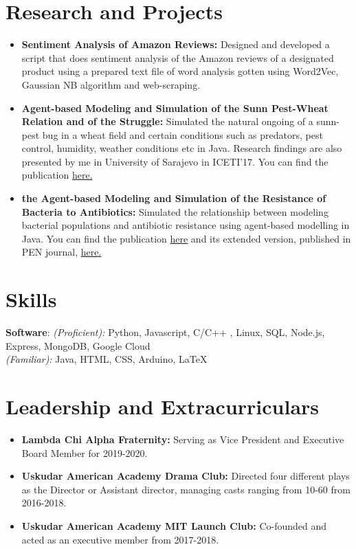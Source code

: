 \documentclass[letterpaper,11pt]{article}
\newcommand{\resumeItem}[2]{
  \item\small{
    \textbf{#1}{#2 \vspace{-2pt}}
  }
}
\newcommand{\resumeSubItem}[2]{\resumeItem{#1}{#2}\vspace{-4pt}}
\newcommand{\resumeSubHeadingListStart}{\begin{itemize}[leftmargin=*]}
\newcommand{\resumeSubHeadingListEnd}{\end{itemize}}
\begin{document}
	\section{Research and Projects}
	\resumeSubHeadingListStart
	\resumeSubItem{Sentiment Analysis of Amazon Reviews: }
	{Designed and developed a script that does sentiment analysis of the Amazon reviews of a designated product using a prepared text file of word analysis gotten using Word2Vec, Gaussian NB algorithm and web-scraping.}
	\resumeSubItem{Agent-based Modeling and Simulation of the Sunn Pest-Wheat Relation and of the Struggle: }
	{Simulated the natural ongoing of a sunn-pest bug in a wheat field and certain conditions such as predators, pest control, humidity, weather conditions etc in Java. Research findings are also presented by me in University of Sarajevo in ICETI'17. You can find the publication  {\href{ https://www.iceti.org/sites/default/files/2017-iceti-proceeding-book-v2.pdf}{here.}}}
	\resumeSubItem{the Agent-based Modeling and Simulation of the Resistance of Bacteria to Antibiotics: }
	{Simulated the relationship between modeling bacterial populations and antibiotic resistance using agent-based modelling in Java. You can find the publication  {\href{ https://www.iceti.org/sites/default/files/2017-iceti-proceeding-book-v2.pdf}{here}} and its extended version, published in PEN journal, {\href{http://pen.ius.edu.ba/index.php/pen/article/view/146/156}{here.}}} 
	\resumeSubHeadingListEnd
	
	
	\section{Skills}\vspace{-2pt}
	\textbf{Software}{: \textit{(Proficient):} Python, Javascript, C/C++ , Linux, SQL, Node.js, Express, MongoDB, Google Cloud \\ 
		\qquad\qquad\quad \textit{(Familiar):  }  Java, HTML, CSS, Arduino, LaTeX}\vspace{-5pt}
	\section{Leadership and Extracurriculars}
	\resumeSubHeadingListStart
	\resumeSubItem{Lambda Chi Alpha Fraternity: }
	{Serving as Vice President and Executive Board Member for 2019-2020.}
	\resumeSubItem{Uskudar American Academy Drama Club: }
	{Directed four different plays as the Director or Assistant director, managing casts ranging from 10-60 from 2016-2018.}
	\resumeSubItem{Uskudar American Academy MIT Launch Club: }
	{Co-founded and acted as an executive member from 2017-2018.}
	
	
	\resumeSubHeadingListEnd
	
	
\end{document}
